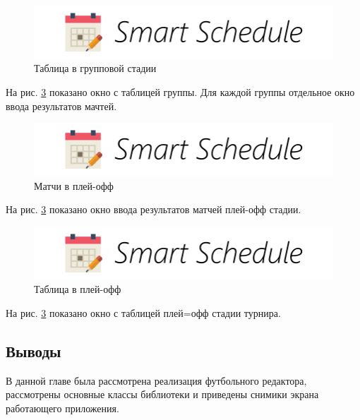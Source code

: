 \begin{figure}[H]
	\begin{center}
		\includegraphics[scale=0.52]{pics/logo}
		\caption{Таблица в групповой стадии} 
		\label{pic:gui_tables_group_stage} %
	\end{center}
\end{figure}
На рис. \ref{pic:gui_tables_playoff_stage} показано окно с таблицей группы. Для каждой группы отдельное окно ввода результатов мачтей.

\begin{figure}[H]
	\begin{center}
		\includegraphics[scale=0.52]{pics/logo}
		\caption{Матчи в плей-офф} 
		\label{pic:gui_matches_playoff_stage} %
	\end{center}
\end{figure}
На рис. \ref{pic:gui_tables_playoff_stage} показано окно ввода результатов матчей плей-офф стадии.

\begin{figure}[H]
	\begin{center}
		\includegraphics[scale=0.52]{pics/logo}
		\caption{Таблица в плей-офф} 
		\label{pic:gui_tables_playoff_stage} %
	\end{center}
\end{figure}
На рис. \ref{pic:gui_tables_playoff_stage} показано окно с таблицей плей=офф стадии турнира.

\subsection{Выводы}
В данной главе была рассмотрена реализация футбольного редактора, рассмотрены основные классы библиотеки и приведены снимики экрана работающего приложения.

